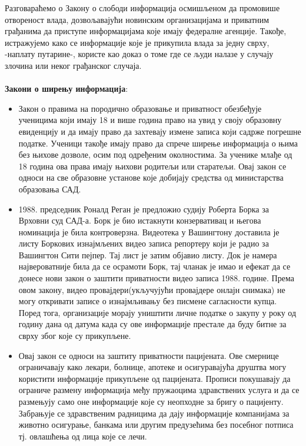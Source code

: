 \documentclass{article}
\begin{document}
Разговараћемо о Закону о слободи информација осмишљеном да промовише отвореност влада, дозвољавајући новинским организацијама и приватним грађанима да приступе информацијама које имају федералне агенције. Такође, истражујемо како се информације које је прикупила влада за једну сврху, -наплату путарине-, користе као доказ о томе где се људи налазе у случају злочина или неког грађанског случаја.
\\\\
\textbf{Закони о ширењу информација}:
\begin{itemize}
  \item Закон о правима на породично образовање и приватност обезбеђује ученицима који имају 18 и више година право на увид у своју образовну евиденцију и да имају право да захтевају измене записа који садрже погрешне податке. Ученици такође имају право да спрече ширење информација о њима без њихове дозволе, осим под одређеним околностима. За ученике млађе од 18 година ова права имају њихови родитељи или старатељи. Овај закон се односи на све образовне установе које добијају средства од министарства образовања САД.
  \item 1988. председник Роналд Реган је предложио судију Роберта Борка за Врховни суд САД-а. Борк је био истакнути конзервативац и
  његова номинација је била контроверзна. Видеотека у Вашингтону доставила је листу Боркових изнајмљених видео записа репортеру који је радио за Вашингтон Сити пејпер. Тај лист је затим објавио листу. Док је намера највероватније била да се осрамоти Борк, тај чланак је имао и ефекат да се донесе нови закон о заштити приватности видео записа 1988. године. Према овом закону, видео провајдери(укључујући провајдере онлајн снимака) не могу откривати записе о изнајмљивању без писмене сагласности купца. Поред тога, организације морају уништити личне податке о закупу у року од годину дана од датума када су ове информације престале да буду битне за сврху због које су прикупљене.
  \item Овај закон се односи на заштиту приватности пацијената. Ове смернице ограничавају како лекари, болнице, апотеке и осигуравајућа друштва могу користити информације прикупљене од пацијената. Прописи покушавају да ограниче размену информација међу пружаоцима здравствених услуга и да се размењују само оне информације које су неопходне за бригу о пацијенту. Забрањује се здравственим радницима да дају информације компанијама за животно осигурање, банкама или другим предузећима без посебног потписа тј. овлашћења од лица које се лечи.

\end{itemize}
\end{document}
